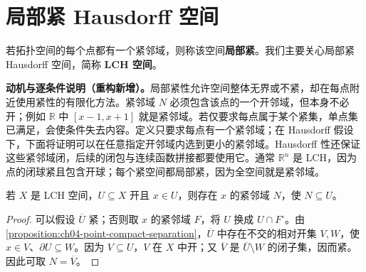 \documentclass[../../main.tex]{subfiles}%
\begin{document}
\section{局部紧 Hausdorff 空间}\label{section:ch04-lch-spaces}
\begin{definition}\label{definition:ch04-locally-compact}
若拓扑空间的每个点都有一个紧邻域，则称该空间\textbf{局部紧}。我们主要关心局部紧 Hausdorff 空间，简称 \textbf{LCH 空间}。
\end{definition}
\begin{remark}
\textbf{动机与逐条件说明（重构新增）。}局部紧性允许空间整体无界或不紧，却在每点附近使用紧性的有限化方法。紧邻域 $N$ 必须包含该点的一个开邻域，但本身不必开；例如 $\mathbb R$ 中 $[x-1,x+1]$ 就是紧邻域。若仅要求每点属于某个紧集，单点集已满足，会使条件失去内容。定义只要求每点有一个紧邻域；在 Hausdorff 假设下，下面将证明可以在任意指定开邻域内选到更小的紧邻域。Hausdorff 性还保证这些紧邻域闭，后续的闭包与连续函数拼接都要使用它。通常 $\mathbb R^n$ 是 LCH，因为点的闭球紧且包含开球；每个紧空间都局部紧，因为全空间就是紧邻域。
\end{remark}
\begin{proposition}\label{proposition:ch04-small-compact-neighborhood}
若 $X$ 是 LCH 空间，$U\subseteq X$ 开且 $x\in U$，则存在 $x$ 的紧邻域 $N$，使 $N\subseteq U$。
\end{proposition}
\begin{proof}
可以假设 $\overline U$ 紧；否则取 $x$ 的紧邻域 $F$，将 $U$ 换成 $U\cap F^\circ$。由\cref{proposition:ch04-point-compact-separation}，$\overline U$ 中存在不交的相对开集 $V,W$，使 $x\in V$、$\partial U\subseteq W$。因为 $V\subseteq U$，$V$ 在 $X$ 中开；又 $\overline V$ 是 $\overline U\setminus W$ 的闭子集，因而紧。因此可取 $N=\overline V$。
\end{proof}
\end{document}
